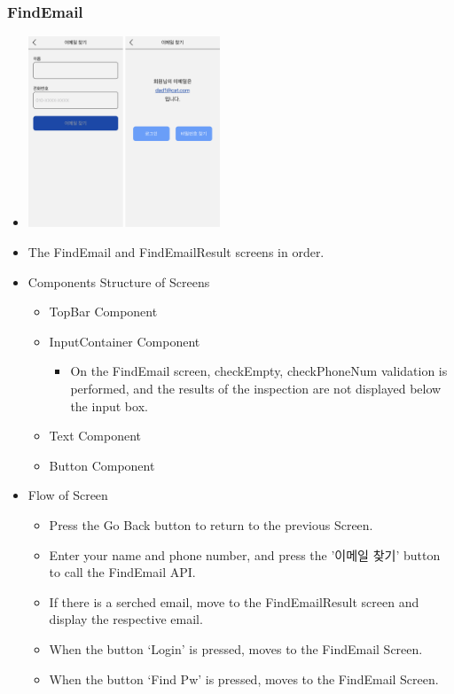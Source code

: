 \documentclass[conference]{IEEEtran}
\begin{document}
\subsubsection{FindEmail}
\begin{itemize}
    \item[] \includegraphics[width=0.45\textwidth]{img/Screen/4_FindEmail.png}
    \item The FindEmail and FindEmailResult screens in order.
    \item Components Structure of Screens
    \begin{itemize}
        \item TopBar Component
        \item InputContainer Component
        \begin{itemize}
            \item On the FindEmail screen, checkEmpty, checkPhoneNum validation is performed, and the results of the inspection are not displayed below the input box.
        \end{itemize}
        \item Text Component
        \item Button Component
    \end{itemize}
    \item Flow of Screen
    \begin{itemize}
        \item Press the Go Back button to return to the previous Screen.
        \item Enter your name and phone number, and press the '이메일 찾기' button to call the FindEmail API.
        \item If there is a serched email, move to the FindEmailResult screen and display the respective email.
        \item When the button ‘{Login}’ is pressed, moves to the FindEmail Screen.
        \item When the button ‘{Find Pw}’ is pressed, moves to the FindEmail Screen.
        \\
    \end{itemize}
\end{itemize}
\newpage
\end{document}
